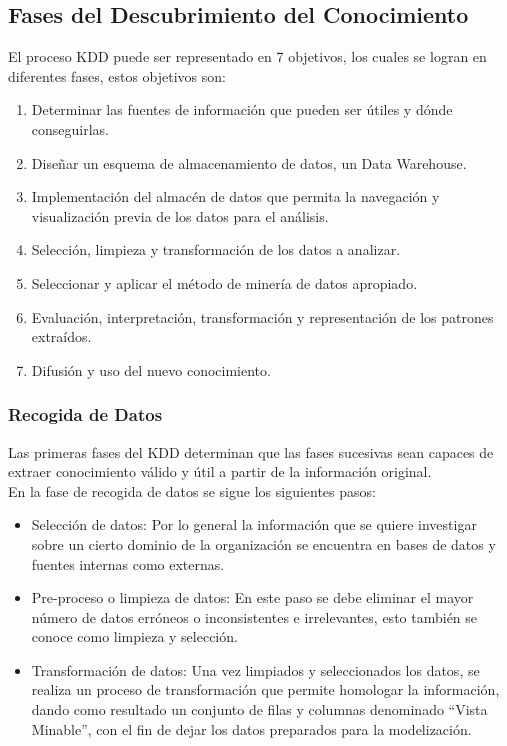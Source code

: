 \subsection{Fases del Descubrimiento del Conocimiento}

El proceso KDD puede ser representado en 7 objetivos, los cuales se logran en diferentes fases, estos objetivos son:

\begin{enumerate}
    \item Determinar las fuentes de información que pueden ser útiles y dónde conseguirlas.
    \item Diseñar un esquema de almacenamiento de datos, un Data Warehouse.
    \item Implementación del almacén de datos que permita la navegación y visualización previa de los datos para el análisis.
    \item Selección, limpieza y transformación de los datos a analizar.
    \item Seleccionar y aplicar el método de minería de datos apropiado.
    \item Evaluación, interpretación, transformación y representación de los patrones extraídos.
    \item Difusión y uso del nuevo conocimiento.
    
\end{enumerate}

\subsubsection{Recogida de Datos}

Las primeras fases del KDD determinan que las fases sucesivas sean capaces de extraer conocimiento válido y útil a partir de la información original.\\

En la fase de recogida de datos se sigue los siguientes pasos:

\begin{itemize}
	\item Selección de datos: 
	Por lo general la información que se quiere investigar sobre un cierto dominio de la organización se encuentra en bases de datos y fuentes internas como externas.
	\item Pre-proceso o limpieza de datos:
	En este paso se debe eliminar el mayor número de datos erróneos o inconsistentes e irrelevantes, esto también se conoce como limpieza y selección.
	\item Transformación de datos:
	Una vez limpiados y seleccionados los datos, se realiza un proceso de transformación que permite homologar la información, dando como resultado un conjunto de filas y columnas denominado ``Vista Minable'', con el fin de dejar los datos preparados para la modelización.
\end{itemize}


